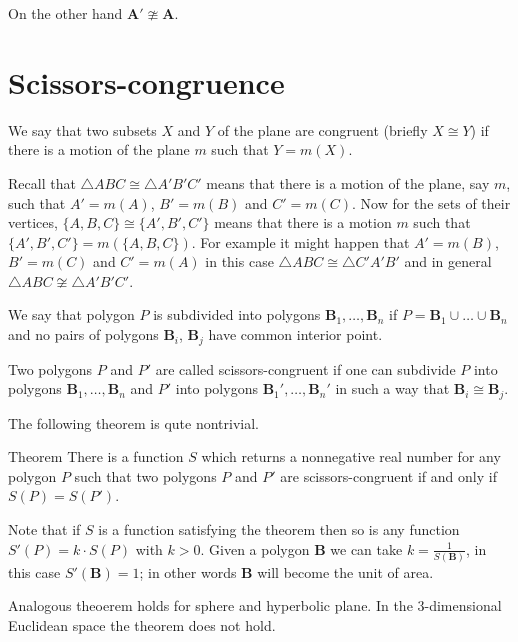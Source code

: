 {On the other hand $\bm{A}'\ncong\bm{A}$.















\section*{Scissors-congruence}

We say that two subsets $X$ and $Y$ 
of the plane are congruent (briefly $X\cong Y$)
if there is a motion of the plane $m$
such that $Y=m(X)$.

Recall that $\triangle ABC\cong\triangle A'B'C'$ means that there is a motion of the plane, say $m$, 
such that $A'=m(A)$, $B'=m(B)$ and $C'=m(C)$.
Now for the sets of their vertices,
$\{A,B,C\}\cong\{A',B',C'\}$ means that there is a motion $m$ such that $\{A',B',C'\}=m(\{A,B,C\})$.
For example it might happen that $A'=m(B)$, $B'=m(C)$ and $C'=m(A)$
in this case $\triangle ABC\cong\triangle C'A'B'$ and in general $\triangle ABC\not\cong\triangle A'B'C'$.

We say that polygon $P$ is subdivided into polygons $\bm{B}_1,\dots, \bm{B}_n$
if $P=\bm{B}_1\cup\dots\cup \bm{B}_n$ and no pairs of polygons $\bm{B}_i$, $\bm{B}_j$ have common interior point.

Two polygons $P$ and $P'$ are called scissors-congruent
if one can subdivide $P$ into polygons $\bm{B}_1,\dots, \bm{B}_n$
and $P'$ into polygons $\bm{B}_1',\dots, \bm{B}_n'$
in such a way that $\bm{B}_i\cong \bm{B}_j$.



The following theorem is qute nontrivial.

\begin{thm}{Theorem}
There is a function $S$ which returns a nonnegative real number for any polygon $P$ such that two polygons $P$ and $P'$ are scissors-congruent
if and only if $S(P)=S(P')$.
\end{thm}

Note that if $S$ is a function satisfying the theorem then so is any function $S'(P)=k\cdot S(P)$ with $k>0$.
Given a polygon $\bm{B}$ we can take $k=\tfrac{1}{S(\bm{B})}$,
in this case $S'(\bm{B})=1$;
in other words $\bm{B}$ will become the unit of area.

Analogous theoerem holds for sphere and hyperbolic plane.
In the $3$-dimensional Euclidean space the theorem does not hold.


}
